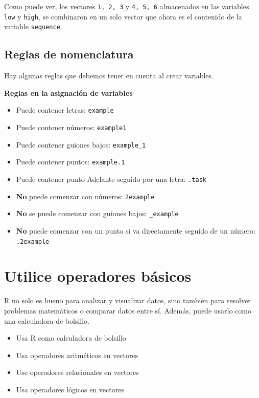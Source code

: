 \documentclass[
]{book}
\providecommand{\tightlist}{%
  \setlength{\itemsep}{0pt}\setlength{\parskip}{0pt}}
\begin{document}
Como puede ver, los vectores \texttt{1,\ 2,\ 3} y \texttt{4,\ 5,\ 6} almacenados en las variables \texttt{low} y \texttt{high}, se combinaron en un solo vector que ahora es el contenido de la variable \texttt{sequence}.

\hypertarget{reglas-de-nomenclatura}{%
\subsection{Reglas de nomenclatura}\label{reglas-de-nomenclatura}}

Hay algunas reglas que debemos tener en cuenta al crear variables.

\textbf{Reglas en la asignación de variables}

\begin{itemize}
\tightlist
\item
  Puede contener letras: \texttt{example}
\item
  Puede contener números: \texttt{example1}
\item
  Puede contener guiones bajos: \texttt{example\_1}
\item
  Puede contener puntos: \texttt{example.1}
\item
  Puede contener punto Adelante seguido por una letra: \texttt{.task}
\item
  \textbf{No} puede comenzar con números: \texttt{2example}
\item
  \textbf{No} se puede comenzar con guiones bajos: \texttt{\_example}
\item
  \textbf{No} puede comenzar con un punto si va directamente seguido de un número: \texttt{.2example}
\end{itemize}

\hypertarget{utilice-operadores-buxe1sicos}{%
\section{Utilice operadores básicos}\label{utilice-operadores-buxe1sicos}}

R no solo es bueno para analizar y visualizar datos, sino también para resolver problemas matemáticos o comparar datos entre sí. Además, puede usarlo como una calculadora de bolsillo.

\begin{itemize}
\tightlist
\item
  Usa R como calculadora de bolsillo
\item
  Usa operadores aritméticos en vectores
\item
  Use operadores relacionales en vectores
\item
  Usa operadores lógicos en vectores
\end{itemize}
\end{document}
